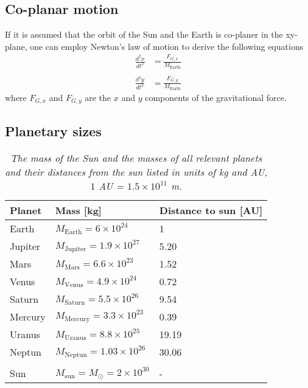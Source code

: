 \documentclass[%
reprint,nofootinbib,
amsmath,amssymb,
aps,
]{revtex4-1}
\begin{document}
\subsection{Co-planar motion} \noindent 
If it is assumed that the orbit of the Sun and the Earth is co-planer in the xy-plane, one can employ Newton's law of motion to derive the following equations
\begin{align}
	\frac{d^2x}{dt^2}&=\frac{F_{G,x}}{M_{\mathrm{Earth}}} \\ & \nonumber \\ 
	\frac{d^2y}{dt^2}&=\frac{F_{G,y}}{M_{\mathrm{Earth}}}
\end{align}
where $F_{G,x}$ and $F_{G,y}$ are the $x$ and $y$ components of the gravitational force. 

\subsection{Planetary sizes}

\begin{table}
	\caption{\textit{The mass of the Sun and the masses of all relevant planets and their distances from the sun listed in units of kg and AU, $1$ AU = $1.5\times 10^{11}$ m. }}
	\begin{tabular}{lll}
		\hline
		\multicolumn{1}{l}{ Planet } \hspace{5mm}& \multicolumn{1}{l}{ Mass [kg] }  \hspace{21mm}& \multicolumn{1}{l}{ Distance to  sun [AU] } \\
		\hline
		Earth   & $M_{\mathrm{Earth}}=6\times 10^{24}$      & 1                    \\
		Jupiter & $M_{\mathrm{Jupiter}}=1.9\times 10^{27}$  & 5.20                 \\
		Mars    & $M_{\mathrm{Mars}}=6.6\times 10^{23}$    & 1.52              \\
		Venus   & $M_{\mathrm{Venus}}=4.9\times 10^{24}$    & 0.72                 \\
		Saturn  & $M_{\mathrm{Saturn}}=5.5\times 10^{26}$  & 9.54                 \\
		Mercury & $M_{\mathrm{Mercury}}=3.3\times 10^{23}$ & 0.39                 \\
		Uranus  & $M_{\mathrm{Uranus}}=8.8\times 10^{25}$   & 19.19                \\
		Neptun  & $M_{\mathrm{Neptun}}=1.03\times 10^{26}$  & 30.06            \\ && \\ 
		Sun & $M_{\mathrm{sun}}=M_{\odot}=2\times 10^{30}$& - \\ 
		\hline
	\end{tabular}
\end{table}
\end{document}
